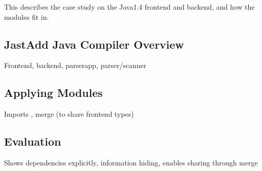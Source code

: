 This describes the case study on the Java1.4 frontend and
backend, and how the modules fit in.

\subsection{JastAdd Java Compiler Overview}

Frontend, backend, parserapp, parser/scanner

\subsection{Applying Modules}

Imports , merge (to share frontend types)

\subsection{Evaluation}

Shows dependencies explicitly, information hiding, enables sharing through merge